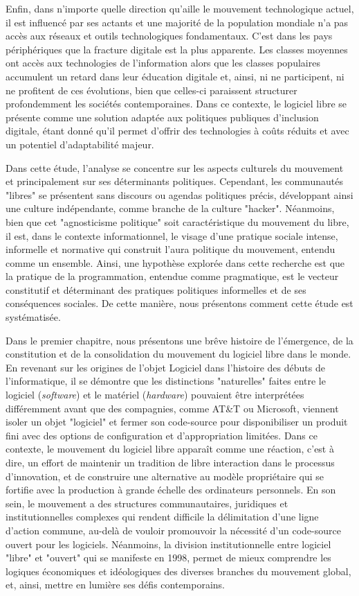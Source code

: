 Enfin, dans n'importe quelle direction qu'aille le mouvement technologique actuel, il est influencé par ses actants et une majorité de la population mondiale n'a pas accès aux réseaux et outils technologiques fondamentaux. C'est dans les pays périphériques que la fracture digitale est la plus apparente. Les classes moyennes ont accès aux technologies de l'information alors que les classes populaires accumulent un retard dans leur éducation digitale et, ainsi, ni ne participent, ni ne profitent de ces évolutions, bien que celles-ci paraissent structurer profondemment les sociétés contemporaines. Dans ce contexte, le logiciel libre se présente comme une solution adaptée aux politiques publiques d'inclusion digitale, étant donné qu'il permet d'offrir des technologies à coûts réduits et avec un potentiel d'adaptabilité majeur.

Dans cette étude, l'analyse se concentre sur les aspects culturels du mouvement et principalement sur ses déterminants politiques. Cependant, les communautés "libres" se présentent sans discours ou agendas politiques précis, développant ainsi une culture indépendante, comme branche de la culture "hacker". Néanmoins, bien que cet "agnosticisme politique" soit caractéristique du mouvement du libre, il est, dans le contexte informationnel, le visage d'une pratique sociale intense, informelle et normative qui construit l'aura politique du mouvement, entendu comme un ensemble. Ainsi, une hypothèse explorée dans cette recherche est que la pratique de la programmation, entendue comme pragmatique, est le vecteur constitutif et déterminant des pratiques politiques informelles et de ses conséquences sociales. De cette manière, nous présentons comment cette étude est systématisée.

Dans le premier chapitre, nous présentons une brêve histoire de l'émergence, de la constitution et de la consolidation du mouvement du logiciel libre dans le monde. En revenant sur les origines de l'objet Logiciel dans l'histoire des débuts de l'informatique, il se démontre que les distinctions "naturelles" faites entre le logiciel (\emph{software}) et le matériel (\emph{hardware}) pouvaient être interprétées différemment avant que des compagnies, comme AT\&T ou Microsoft, viennent isoler un objet "logiciel" et fermer son code-source pour disponibiliser un produit fini avec des options de configuration et d'appropriation limitées. Dans ce contexte, le mouvement du logiciel libre apparaît comme une réaction, c'est à dire, un effort de maintenir un tradition de libre interaction dans le processus d'innovation, et de construire une alternative au modèle propriétaire qui se fortifie avec la production à grande échelle des ordinateurs personnels. En son sein, le mouvement a des structures communautaires, juridiques et institutionnelles complexes qui rendent difficile la délimitation d'une ligne d'action commune, au-delà de vouloir promouvoir la nécessité d'un code-source ouvert pour les logiciels. Néanmoins, la division institutionnelle entre logiciel "libre" et "ouvert" qui se manifeste en 1998, permet de mieux comprendre les logiques économiques et idéologiques des diverses branches du mouvement global, et, ainsi, mettre en lumière ses défis contemporains.


